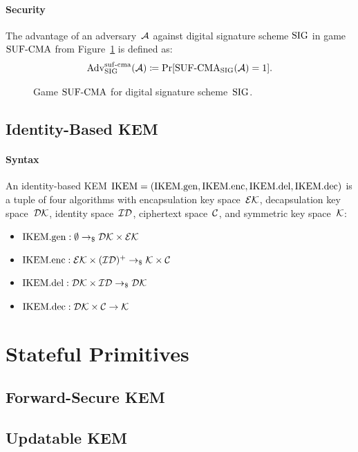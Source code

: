 \documentclass[a4paper,orivec]{llncs}
\begin{document}
\paragraph{Security}
The advantage of an adversary~$\mathcal{A}$ against digital signature scheme $\mathrm{SIG}$ in game ${\mathrm{SUF}\text{-}\mathrm{CMA}}$ from Figure~\ref{fig:sig:suf} is defined as:
\[
\mathrm{Adv}_{\mathrm{SIG}}^{\mathrm{suf}\text{-}\mathrm{cma}}(\mathcal{A})\coloneqq\Pr[{\mathrm{SUF}\text{-}\mathrm{CMA}}_{\mathrm{SIG}}(\mathcal{A})=1]\text{.}
\]

\begin{figure}[!ht]
    \centering
    \nicoresetlinenr%
    \fbox{%
        \scalebox{\codescalefactor}{%
        }%
    }
    \caption{%
        Game ${\mathrm{SUF}\text{-}\mathrm{CMA}}$ for digital signature scheme~$\mathrm{SIG}$.
    }
    \label{fig:sig:suf}
\end{figure}

\subsection{Identity-Based KEM}

\paragraph{Syntax}
An identity-based KEM $\mathrm{IKEM}=(\mathrm{IKEM}.\mathrm{gen},\mathrm{IKEM}.\mathrm{enc},\mathrm{IKEM}.\mathrm{del},\mathrm{IKEM}.\mathrm{dec})$ is a tuple of four algorithms with encapsulation key space~$\mathcal{EK}$, decapsulation key space~$\mathcal{DK}$, identity space~$\mathcal{ID}$, ciphertext space~$\mathcal{C}$, and symmetric key space~$\mathcal{K}$:

\begin{itemize}
    \item $\mathrm{IKEM}.\mathrm{gen}: \emptyset \to_\$ \mathcal{DK}\times\mathcal{EK}$
    \item $\mathrm{IKEM}.\mathrm{enc}: \mathcal{EK}\times(\mathcal{ID})^+ \to_\$ \mathcal{K}\times\mathcal{C}$
    \item $\mathrm{IKEM}.\mathrm{del}: \mathcal{DK}\times\mathcal{ID} \to_\$ \mathcal{DK}$
    \item $\mathrm{IKEM}.\mathrm{dec}: \mathcal{DK}\times\mathcal{C} \to \mathcal{K}$
\end{itemize}


\section{Stateful Primitives}

\subsection{Forward-Secure KEM}



\subsection{Updatable KEM}
\end{document}

